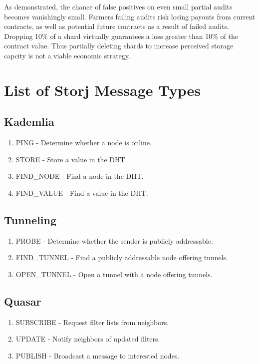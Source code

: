 \documentclass[a4paper,10pt]{article}
\begin{document}
As demonstrated, the chance of false positives on even small partial audits becomes vanishingly small. Farmers failing audits risk losing payouts from current contracts, as well as potential future contracts as a result of failed audits. Dropping 10\% of a shard virtually guarantees a loss greater than 10\% of the contract value. Thus partially deleting shards to increase perceived storage capcity is not a viable economic strategy.

\newpage
\appendix
\section{List of Storj Message Types}
\subsection{Kademlia}
\begin{enumerate}
\item PING - Determine whether a node is online.
\item STORE - Store a value in the DHT.
\item FIND\_NODE - Find a node in the DHT.
\item FIND\_VALUE - Find a value in the DHT.
\setcounter{enumTemp}{\theenumi}
\end{enumerate}
\subsection{Tunneling}
\begin{enumerate}
\setcounter{enumi}{\theenumTemp}
\item PROBE - Determine whether the sender is publicly addressable.
\item FIND\_TUNNEL - Find a publicly addressable node offering tunnels.
\item OPEN\_TUNNEL - Open a tunnel with a node offering tunnels.
\setcounter{enumTemp}{\theenumi}
\end{enumerate}
\subsection{Quasar}
\begin{enumerate}
\setcounter{enumi}{\theenumTemp}
\item SUBSCRIBE - Request filter lists from neighbors.
\item UPDATE - Notify neighbors of updated filters.
\item PUBLISH - Broadcast a message to interested nodes.
\setcounter{enumTemp}{\theenumi}
\end{enumerate}
\end{document}
